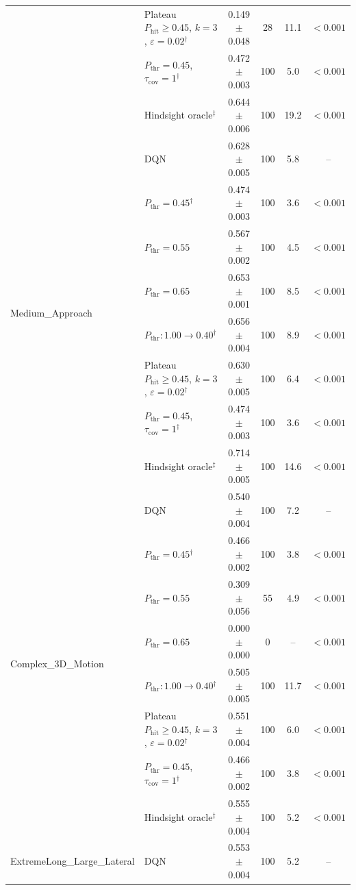 \begin{table}[htbp]
\begin{tabular}{llcccc}
 & Plateau $P_{\mathrm{hit}}\geq0.45$, $k=3$, $\varepsilon=0.02$$^{\dagger}$ & 0.149 $\pm$ 0.048 & 28 & 11.1 & $<0.001$ \\
 & $P_{\mathrm{thr}}=0.45$, $\tau_{\mathrm{cov}}=1$$^{\dagger}$ & 0.472 $\pm$ 0.003 & 100 & 5.0 & $<0.001$ \\
 & Hindsight oracle$^{\ddagger}$ & 0.644 $\pm$ 0.006 & 100 & 19.2 & $<0.001$ \\
\midrule
\multirow{8}{*}{Medium\_Approach} & DQN & 0.628 $\pm$ 0.005 & 100 & 5.8 & -- \\
 & $P_{\mathrm{thr}}=0.45$$^{\dagger}$ & 0.474 $\pm$ 0.003 & 100 & 3.6 & $<0.001$ \\
 & $P_{\mathrm{thr}}=0.55$ & 0.567 $\pm$ 0.002 & 100 & 4.5 & $<0.001$ \\
 & $P_{\mathrm{thr}}=0.65$ & 0.653 $\pm$ 0.001 & 100 & 8.5 & $<0.001$ \\
 & $P_{\mathrm{thr}}: 1.00 \to 0.40$$^{\dagger}$ & 0.656 $\pm$ 0.004 & 100 & 8.9 & $<0.001$ \\
 & Plateau $P_{\mathrm{hit}}\geq0.45$, $k=3$, $\varepsilon=0.02$$^{\dagger}$ & 0.630 $\pm$ 0.005 & 100 & 6.4 & $<0.001$ \\
 & $P_{\mathrm{thr}}=0.45$, $\tau_{\mathrm{cov}}=1$$^{\dagger}$ & 0.474 $\pm$ 0.003 & 100 & 3.6 & $<0.001$ \\
 & Hindsight oracle$^{\ddagger}$ & 0.714 $\pm$ 0.005 & 100 & 14.6 & $<0.001$ \\
\midrule
\multirow{8}{*}{Complex\_3D\_Motion} & DQN & 0.540 $\pm$ 0.004 & 100 & 7.2 & -- \\
 & $P_{\mathrm{thr}}=0.45$$^{\dagger}$ & 0.466 $\pm$ 0.002 & 100 & 3.8 & $<0.001$ \\
 & $P_{\mathrm{thr}}=0.55$ & 0.309 $\pm$ 0.056 & 55 & 4.9 & $<0.001$ \\
 & $P_{\mathrm{thr}}=0.65$ & 0.000 $\pm$ 0.000 & 0 & -- & $<0.001$ \\
 & $P_{\mathrm{thr}}: 1.00 \to 0.40$$^{\dagger}$ & 0.505 $\pm$ 0.005 & 100 & 11.7 & $<0.001$ \\
 & Plateau $P_{\mathrm{hit}}\geq0.45$, $k=3$, $\varepsilon=0.02$$^{\dagger}$ & 0.551 $\pm$ 0.004 & 100 & 6.0 & $<0.001$ \\
 & $P_{\mathrm{thr}}=0.45$, $\tau_{\mathrm{cov}}=1$$^{\dagger}$ & 0.466 $\pm$ 0.002 & 100 & 3.8 & $<0.001$ \\
 & Hindsight oracle$^{\ddagger}$ & 0.555 $\pm$ 0.004 & 100 & 5.2 & $<0.001$ \\
\midrule
\multirow{8}{*}{ExtremeLong\_Large\_Lateral} & DQN & 0.553 $\pm$ 0.004 & 100 & 5.2 & -- \\

\end{tabular}
\end{table}
